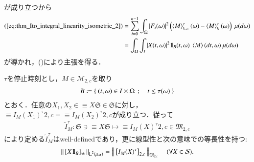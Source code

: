 \begin{prf}
\begin{description}
				が成り立つから
				\begin{align}
					\mbox{(\refeq{eq:thm_Ito_integral_linearity_isometric_2})}
					&= \sum_{i=0}^{n-1} \int_\Omega |F_i(\omega)|^2 \left( \inprod<M>^\tau_{t_{i+1}}(\omega) - \inprod<M>^\tau_{t_i}(\omega) \right)\ \mu(d\omega) \\
					&= \int_\Omega \int_I |X(t,\omega)|^2 \defunc_B(t,\omega)\ \inprod<M>(dt,\omega)\ \mu(d\omega)
				\end{align}
				が導かれ，()により主張を得る．
				\QED
		\end{description}
	\end{prf}
	
	\begin{screen}
		\begin{thm}[同値類に対する伊藤積分]
			$\tau$を停止時刻とし，$M \in \mathcal{M}_{2,c}$を取り
			\begin{align}
				B \coloneqq \left\{\ (t,\omega) \in I \times \Omega\ \, ; \quad t \leq \tau(\omega)\ \right\}
			\end{align}
			とおく．任意の$X_1,X_2 \in \equiv{X}{\mathfrak{S}} \in \mathfrak{S}$に対し，
			$\equiv{I_M(X_1)^\tau}{2,c} = \equiv{I_M(X_2)^\tau}{2,c}$が成り立つ．従って
			\begin{align}
				\tilde{I}^\tau_M:\mathfrak{S} \ni \equiv{X}{\mathfrak{S}} \longmapsto \equiv{I_M(X)^\tau}{2,c} \in \mathfrak{M}_{2,c}
			\end{align}
			により定める$\tilde{I}^\tau_M$はwell-definedであり，更に線型性と次の意味での等長性を持つ:
			\begin{align}
				\left\|\, \left[X \mbox{1}\hspace{-0.25em}\mbox{l}_B\right]_{\mathfrak{S}}\, \right\|_{\operatorname{L}^{2} \left(\mu_M\right)} = \left\|\, \left[I_M(X)^\tau\right]_{2,c}\, \right\|_{\mathfrak{M}_{2,c}}
				\quad (\forall X \in \mathcal{S}).
				\label{eq:thm_Ito_integral_equiv_class_linearity_isometric}
			\end{align}
			\label{thm:Ito_integral_equiv_class_linearity_isometric}
		\end{thm}
	\end{screen}
	
